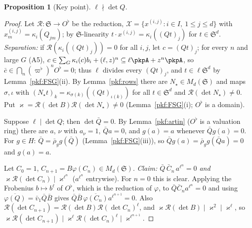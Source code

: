 \documentclass[10pt]{amsart}
\newtheorem{proposition}[theorem]{Proposition}
\theoremstyle{definition}
\theoremstyle{remark}
\begin{document}
\begin{proposition}[Key point]\label{pkf:key}
$\ell\nmid\det Q$.
\end{proposition}

\begin{proof}
Let $\mathcal R\colon\mathfrak S\to O^\flat$ be the reduction, $\mathcal X=\{x^{(i,j)}:i\in I,\ 1\le j\le d\}$
with $x^{(i,j)}_m=\kappa_i(Q_{jm})$; by $\mathfrak S$-linearity $t\cdot x^{(i,j)}=\kappa_i((Qt)_j)$ for
$t\in\mathfrak S^d$. \emph{Separation:} if $\mathcal R(\kappa_i((Qt)_j))=0$ for all $i,j$, let $c=(Qt)_j$;
for every $n$ and large $G$ (A5), $c\in\sum_G\kappa_i(c)b_i+(\ell,z)^n\subseteq\ell\pkpA+z^n\pkpA$, so
$\bar c\in\bigcap_n(\varpi^\flat)^nO^\flat=0$; thus $\ell$ divides every $(Qt)_j$, and $t\in\ell\mathfrak S^d$
by Lemma~\ref{pkf:FSG}(ii). By Lemma~\ref{pkf:rows} there are $N_\star\in M_d(\mathfrak S)$ and maps
$\sigma,\iota$ with $(N_\star t)_k=\kappa_{\sigma(k)}((Qt)_{\iota(k)})$ for all $t\in\mathfrak S^d$ and
$\mathcal R(\det N_\star)\ne0$. Put $\varkappa=\mathcal R(\det B)\mathcal R(\det N_\star)\ne0$ (Lemma~\ref{pkf:FSG}(i);
$O^\flat$ is a domain).

Suppose $\ell\mid\det Q$; then $\det\bar Q=0$. By Lemma~\ref{pkf:artin} ($O^\flat$ is a valuation ring) there
are $a$, $\nu$ with $a_\nu=1$, $\bar Qa=0$, and $g(a)=a$ whenever $\bar Qg(a)=0$. For $g\in H$:
$\bar Q=\bar\rho_gg(\bar Q)$ (Lemma~\ref{pkf:FSG}(iii)), so $\bar Qg(a)=\bar\rho_gg(\bar Qa)=0$ and
$g(a)=a$.

Let $C_0=1$, $C_{n+1}=B\varphi(C_n)\in M_d(\mathfrak S)$. \emph{Claim: $\bar Q\,\bar C_n\,a^{\ell^n}=0$
and $\varkappa\mathcal R(\det C_n)\mid \varkappa^{\ell^n}$} ($a^{\ell^n}$ entrywise). For $n=0$ this is clear. Applying the
Frobenius $b\mapsto b^\ell$ of $O^\flat$, which is the reduction of $\varphi$, to $\bar Q\bar C_na^{\ell^n}
=0$ and using $\overline{\varphi(Q)}=\bar v_1\bar Q\bar B$ gives $\bar Q\bar B\,\overline{\varphi(C_n)}
a^{\ell^{n+1}}=0$. Also $\mathcal R(\det C_{n+1})=\mathcal R(\det B)\mathcal R(\det C_n)^\ell$, and
$\varkappa\mathcal R(\det B)\mid \varkappa^2\mid \varkappa^\ell$, so $\varkappa\mathcal R(\det C_{n+1})\mid \varkappa^\ell\mathcal R(\det
C_n)^\ell\mid \varkappa^{\ell^{n+1}}$.


\end{proof}
\end{document}
